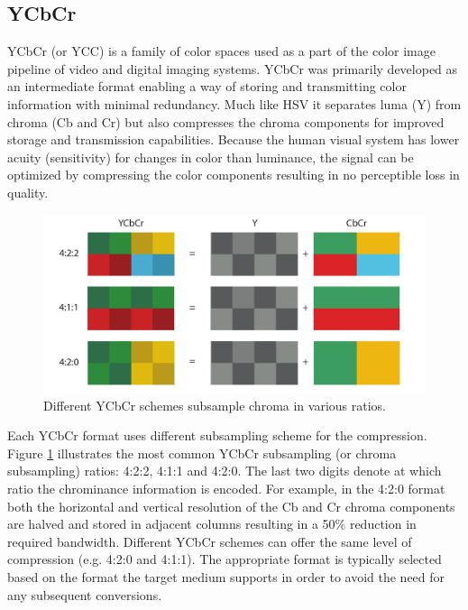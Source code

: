 \documentclass[thesis.tex]{subfiles}
\begin{document}
\subsection{YCbCr}
YCbCr (or YCC) is a family of color spaces used as a part of the color image pipeline of video and digital imaging systems. YCbCr was primarily developed as an intermediate format enabling a way of storing and transmitting color information with minimal redundancy. Much like HSV it separates luma (Y) from chroma (Cb and Cr) but also compresses the chroma components for improved storage and transmission capabilities. Because the human visual system has lower acuity (sensitivity) for changes in color than luminance, the signal can be optimized by compressing the color components resulting in no perceptible loss in quality. \cite{color_vision}

\begin{figure}[h]
\centering \includegraphics[width=\textwidth]{images/ycbcr}
\caption{Different YCbCr schemes subsample chroma in various ratios.\label{figure:ycbcr}}
\end{figure}

Each YCbCr format uses different subsampling scheme for the compression. Figure \ref{figure:ycbcr} illustrates the most common YCbCr subsampling (or chroma subsampling) ratios: 4:2:2, 4:1:1 and 4:2:0. The last two digits denote at which ratio the chrominance information is encoded. For example, in the 4:2:0 format both the horizontal and vertical resolution of the Cb and Cr chroma components are halved and stored in adjacent columns resulting in a 50\% reduction in required bandwidth. Different YCbCr schemes can offer the same level of compression (e.g. 4:2:0 and 4:1:1). The appropriate format is typically selected based on the format the target medium supports in order to avoid the need for any subsequent conversions.
\end{document}
